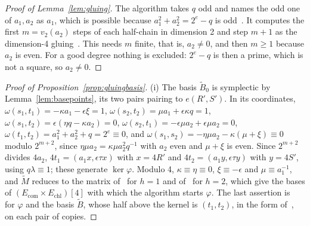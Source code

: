 \documentclass[version=preprint]{iacrcc}
\newcommand{\Ecom}{E_{\mathrm{com}}}
\newcommand{\Echl}{E_{\mathrm{chl}}}
\begin{document}
    \begin{proof}[Proof of Lemma~\ref{lem:gluing}]
        The algorithm takes $q$ odd and names the odd one of $a_1, a_2$ as $a_1$,
        which is possible because $a_1^2 + a_2^2 = 2^e - q$ is odd~\cite[Section
        5.1 and Algorithm 6]{Dar24}. It computes the first $m = v_2(a_2)$ steps
        of each half-chain in dimension 2 and step $m + 1$ as the dimension-4
        gluing~\cite[Lemmas 23 and 28]{Dar24}. This needs $m$ finite, that is,
        $a_2 \neq 0$, and then $m \ge 1$ because $a_2$ is even. For a good degree
        nothing is excluded: $2^e - q$ is then a prime, which is not a square, so
        $a_2 \neq 0$.
    \end{proof}

    \begin{proof}[Proof of Proposition~\ref{prop:gluingbasis}]
        (i) The basis $\tilde B_0$ is symplectic by Lemma~\ref{lem:basepoints},
        its two pairs pairing to $e(R', S')$. In its coordinates,
        $\omega(s_1, t_1) = -\kappa a_1 - \epsilon \xi = 1$, $\omega(s_2, t_2) = \mu a_1
        + \epsilon \kappa q = 1$, $\omega(s_1, t_2) = \epsilon(\eta q - \kappa a_2) = 0$,
        $\omega(s_2, t_1) = -\epsilon \mu a_2 + \epsilon \mu a_2 = 0$,
        $\omega(t_1, t_2) = a_1^2 + a_2^2 + q = 2^e \equiv 0$, and $\omega(s_1,
        s_2) = -\eta \mu a_2 - \kappa(\mu + \xi) \equiv 0$ modulo $2^{m+2}$, since $\eta \mu
        a_2 = \kappa \mu a_2^2 q^{-1}$ with $a_2$ even and $\mu + \xi$ is even. Since
        $2^{m+2}$ divides $4 a_2$, $4 t_1 = (a_1 x, \epsilon\tau x)$ with $x =
        4R'$ and $4 t_2 = (a_1 y, \epsilon\tau y)$ with $y = 4S'$, using $q
        \lambda \equiv 1$; these generate $\ker\varphi$. Modulo 4, $\kappa \equiv \eta
        \equiv 0$, $\xi \equiv -\epsilon$ and $\mu \equiv a_1^{-1}$, and $\tilde M$
        reduces to the matrix of~\cite[proof of Lemma 25]{Dar24} for $h = 1$ and
        of~\cite[Appendix C.1]{Dar24} for $h = 2$, which give the bases of
        $(\Ecom \times \Echl)[4]$ with which the algorithm starts $\varphi$. The
        last assertion is~\cite[Theorem 56]{DLRW24} for $\varphi$ and the basis
        $\tilde B$, whose half above the kernel is $(t_1, t_2)$, in the form
        of~\cite[Section 4.2]{Dar24}, on each pair of copies.


\end{proof}
\end{document}
